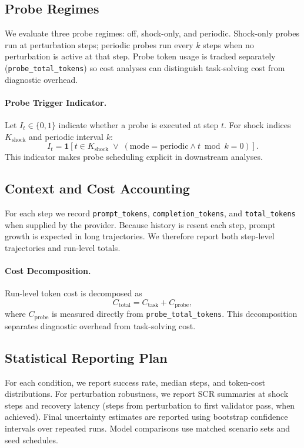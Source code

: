 \subsection{Probe Regimes}
We evaluate three probe regimes: off, shock-only, and periodic. Shock-only probes run at perturbation steps; periodic probes run every \(k\) steps when no perturbation is active at that step. Probe token usage is tracked separately (\texttt{probe\_total\_tokens}) so cost analyses can distinguish task-solving cost from diagnostic overhead.

\paragraph{Probe Trigger Indicator.}
Let \(I_t \in \{0,1\}\) indicate whether a probe is executed at step \(t\). For shock indices \(K_{\text{shock}}\) and periodic interval \(k\):
\[
I_t = \mathbf{1}\!\left[t \in K_{\text{shock}} \;\lor\; (\text{mode}=\text{periodic} \land t \bmod k = 0)\right].
\]
This indicator makes probe scheduling explicit in downstream analyses.

\subsection{Context and Cost Accounting}
For each step we record \texttt{prompt\_tokens}, \texttt{completion\_tokens}, and \texttt{total\_tokens} when supplied by the provider. Because history is resent each step, prompt growth is expected in long trajectories. We therefore report both step-level trajectories and run-level totals.

\paragraph{Cost Decomposition.}
Run-level token cost is decomposed as
\[
C_{\text{total}} = C_{\text{task}} + C_{\text{probe}},
\]
where \(C_{\text{probe}}\) is measured directly from \texttt{probe\_total\_tokens}. This decomposition separates diagnostic overhead from task-solving cost.

\subsection{Statistical Reporting Plan}
For each condition, we report success rate, median steps, and token-cost distributions. For perturbation robustness, we report SCR summaries at shock steps and recovery latency (steps from perturbation to first validator pass, when achieved). Final uncertainty estimates are reported using bootstrap confidence intervals over repeated runs. Model comparisons use matched scenario sets and seed schedules.

